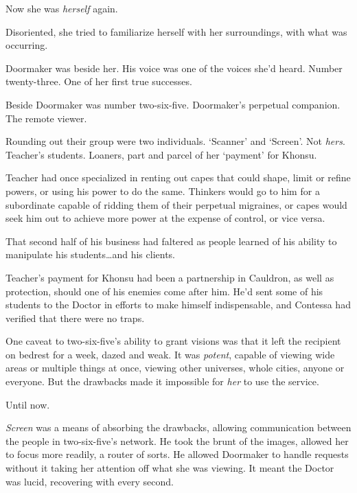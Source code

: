 Now she was \emph{herself }again.



Disoriented, she tried to familiarize herself with her surroundings, with what was occurring.



Doormaker was beside her.  His voice was one of the voices she'd heard.  Number twenty-three.  One of her first true successes.



Beside Doormaker was number two-six-five.  Doormaker's perpetual companion.  The remote viewer.



Rounding out their group were two individuals.  `Scanner' and `Screen'.  Not \emph{hers}.  Teacher's students.  Loaners, part and parcel of her `payment' for Khonsu.



Teacher had once specialized in renting out capes that could shape, limit or refine powers, or using his power to do the same.  Thinkers would go to him for a subordinate capable of ridding them of their perpetual migraines, or capes would seek him out to achieve more power at the expense of control, or vice versa.



That second half of his business had faltered as people learned of his ability to manipulate his students\ldots and his clients.



Teacher's payment for Khonsu had been a partnership in Cauldron, as well as protection, should one of his enemies come after him.  He'd sent some of his students to the Doctor in efforts to make himself indispensable, and Contessa had verified that there were no traps.



One caveat to two-six-five's ability to grant visions was that it left the recipient on bedrest for a week, dazed and weak.  It was \emph{potent}, capable of viewing wide areas or multiple things at once, viewing other universes, whole cities, anyone or everyone.  But the drawbacks made it impossible for \emph{her} to use the service.



Until now.



\emph{Screen} was a means of absorbing the drawbacks, allowing communication between the people in two-six-five's network.  He took the brunt of the images, allowed her to focus more readily, a router of sorts.  He allowed Doormaker to handle requests without it taking her attention off what she was viewing.  It meant the Doctor was lucid, recovering with every second.



